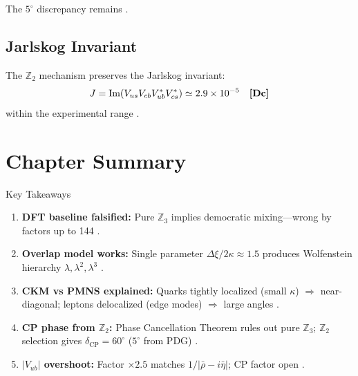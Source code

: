 The $5^\circ$ discrepancy remains \tagOpen{}.

\subsection{Jarlskog Invariant}

The $\mathbb{Z}_2$ mechanism preserves the Jarlskog invariant:
\begin{equation}
    J = \text{Im}(V_{us}V_{cb}V_{ub}^*V_{cs}^*) \simeq 2.9 \times 10^{-5}
    \quad \textbf{[Dc]}{}
\end{equation}
within the experimental range \tagBL{}.

\section{Chapter Summary}
\label{sec:ckm_summary}

\begin{statusbox}{Key Takeaways}
\begin{enumerate}
\item \textbf{DFT baseline falsified:}
      Pure $\mathbb{Z}_3$ \tagDerSym{} implies democratic mixing---wrong by factors up to 144 \tagDc{}.

\item \textbf{Overlap model works:}
      Single parameter $\Delta\xi/2\kappa \approx 1.5$ produces Wolfenstein hierarchy
      $\lambda, \lambda^2, \lambda^3$ \tagDc{}.

\item \textbf{CKM vs PMNS explained:}
      Quarks tightly localized (small $\kappa$) $\Rightarrow$ near-diagonal;
      leptons delocalized (edge modes) $\Rightarrow$ large angles \tagI{}.

\item \textbf{CP phase from $\mathbb{Z}_2$:}
      Phase Cancellation Theorem rules out pure $\mathbb{Z}_3$;
      $\mathbb{Z}_2$ selection gives $\delta_{\text{CP}} = 60^\circ$ ($5^\circ$ from PDG) \tagDc{}.

\item \textbf{$|V_{ub}|$ overshoot:}
      Factor $\times 2.5$ matches $1/|\bar\rho - i\bar\eta|$; CP factor open \tagOpen{}.
\end{enumerate}
\end{statusbox}

